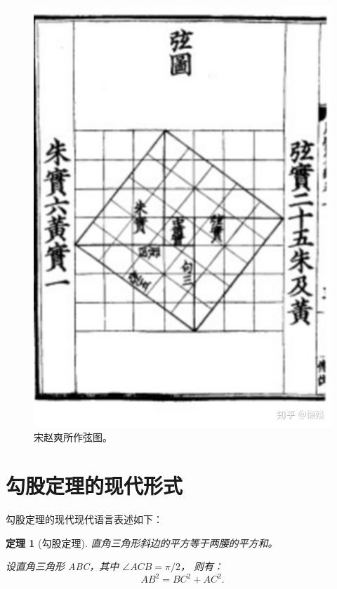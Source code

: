 \documentclass[UTF8]{ctexart}
\newtheorem{thm}{定理}          %
\begin{document}
        \begin{figure}[ht]
            \centering
            \includegraphics[scale=0.5]{xiantu.jpg}
            \caption{宋赵爽所作弦图。}
        \end{figure}

    \section{勾股定理的现代形式}
        勾股定理的现代现代语言表述如下\cite{Shiye}：
        \begin{thm}[勾股定理]                       %
            直角三角形斜边的平方等于两腰的平方和。

            设直角三角形 ABC，其中 $\angle ACB = \pi / 2$，
            则有：
            \begin{equation}
                AB^2 = BC^2 + AC^2.
            \end{equation}
        \end{thm}
\end{document}
